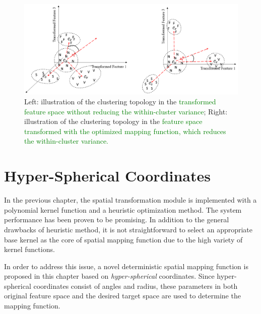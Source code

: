 \begin{figure}[t]
\centering
\includegraphics[scale=.42]{Fig/topo2.png}
\caption{Left: illustration of the clustering topology in the \textcolor{green}{transformed feature space without reducing the within-cluster variance}; %
Right: illustration of the clustering topology in the \textcolor{green}{feature space transformed with the optimized mapping function, which reduces the within-cluster variance.}}%
\label{fig:topo2}
\end{figure}

\section{Hyper-Spherical Coordinates}

In the previous chapter, the spatial transformation module is implemented with a polynomial kernel function and a heuristic optimization method. The system performance has been proven to be promising. In addition to the general drawbacks of heuristic method, it is not straightforward to select an appropriate base kernel as the core of spatial mapping function due to the high variety of kernel functions. %

In order to address this issue, a novel deterministic spatial mapping function is proposed in this chapter based on \textit{hyper-spherical} coordinates\cite{nsphere}. Since hyper-spherical coordinates consist of angles and radius, these parameters in both original feature space and the desired target space are used to determine the mapping function.


